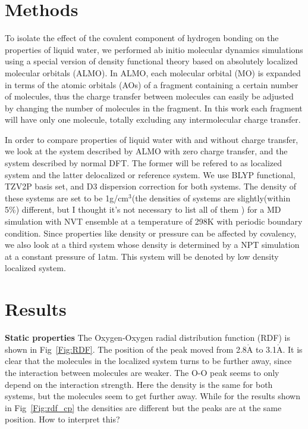 \documentclass[prl,twocolumn,showpacs]{revtex4}
\begin{document}
\section{Methods}

To isolate the effect of the covalent component of hydrogen bonding on the properties of liquid water, we performed ab initio molecular dynamics simulations using a special version of density functional theory based on absolutely localized molecular orbitals (ALMO)\cite{khaliullin2006efficient,Khaliullin2013JCTC}. In ALMO, each molecular orbital (MO) is expanded in terms of the atomic orbitals (AOs) of a fragment containing a certain number of molecules, thus the charge transfer between molecules can easily be adjusted by changing the number of molecules in the fragment. In this work each fragment will have only one molecule, totally excluding any intermolecular charge transfer. 
 \old


In order to compare properties of liquid water with and without charge transfer, we look at the system described by ALMO with zero charge transfer, and the system described by normal DFT. The former will be refered to as localized system and the latter delocalized or reference system. We use BLYP functional, TZV2P basis set, and D3 dispersion correction for both systems. The density of these systems are set to be 1g/cm$^3$(\new the densities of systems are slightly(within 5\%) different, but I thought it's not necessary to list all of them \old) for a MD simulation with NVT ensemble at a temperature of 298K with periodic boundary condition. Since properties like density or pressure can be affected by covalency, we also look at a third system whose density is determined by a NPT simulation at a constant pressure of 1atm. This system will be denoted by low density localized system.


\section{Results}

\textbf{Static properties} The Oxygen-Oxygen radial distribution function (RDF) is shown in Fig~\ref{Fig:RDF}. The position of the peak moved from 2.8$\mathring{\text{A}}$ to 3.1$\mathring{\text{A}}$. It is clear that the molecules in the localized system turns to be further away, since the interaction between molecules are weaker. \new The O-O peak seems to only depend on the interaction strength. Here the density is the same for both systems, but the molecules seem to get further away. While for the results shown in Fig~\ref{Fig:rdf_cp} the densities are different but the peaks are at the same position. How to interpret this? \old
\end{document}
